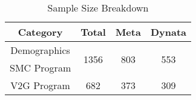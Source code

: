 \begin{table}[H]
\centering
\caption{Sample Size Breakdown}
\begin{tabular}{cccc}
\toprule
\textbf{Category} & \textbf{Total} & \textbf{Meta} & \textbf{Dynata} \\
\midrule
Demographics & \multirow{2}{*}{1356} & \multirow{2}{*}{803} & \multirow{2}{*}{553} \\
SMC Program & & & \\
\cmidrule(lr){1-4}
V2G Program & 682 & 373 & 309 \\
\bottomrule
\end{tabular}
\label{table_sample_size}
\end{table}
